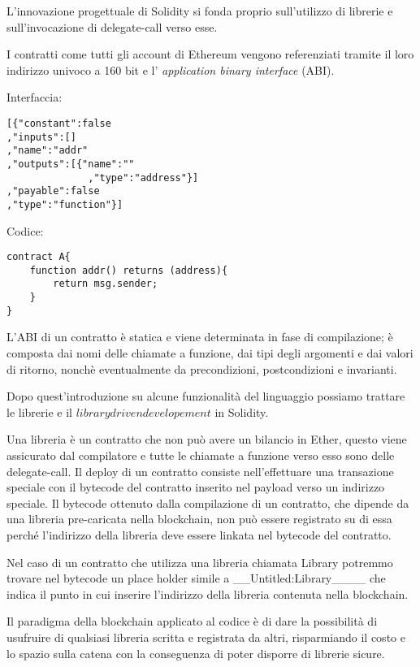 		L'innovazione progettuale di Solidity si fonda proprio sull'utilizzo di librerie e sull'invocazione di delegate-call verso esse.

		I contratti come tutti gli account di Ethereum vengono referenziati tramite il loro indirizzo univoco a 160 bit e l' \textit{application binary interface} (ABI).
	
		\begin{multicols}{2}
			 Interfaccia:
			\begin{lstlisting}
[{"constant":false
,"inputs":[]
,"name":"addr"
,"outputs":[{"name":""
			  ,"type":"address"}]
,"payable":false
,"type":"function"}]
			\end{lstlisting}
			\columnbreak
			Codice:
			\begin{lstlisting}
contract A{
	function addr() returns (address){
		return msg.sender;
	}
}
			\end{lstlisting}
		\end{multicols}
		
		L'ABI di un contratto è statica e viene determinata in fase di compilazione; è composta dai nomi delle chiamate a funzione, dai tipi degli argomenti e dai valori di ritorno, nonchè eventualmente da precondizioni, postcondizioni e invarianti.
		
		Dopo quest'introduzione su alcune funzionalità del linguaggio possiamo trattare le librerie e il $library driven developement$ in Solidity.
		
		Una libreria è un contratto che non può avere un bilancio in Ether, questo viene assicurato dal compilatore e tutte le chiamate a funzione verso esso sono delle delegate-call.
		Il deploy di un contratto consiste nell'effettuare una transazione speciale con il bytecode del contratto inserito nel payload verso un indirizzo speciale.
		Il bytecode ottenuto dalla compilazione di un contratto, che dipende da una libreria pre-caricata nella blockchain, non può essere registrato su di essa perché l'indirizzo della libreria deve essere linkata nel bytecode del contratto. 
		
		Nel caso di un contratto che utilizza una libreria chiamata Library potremmo trovare nel bytecode un place holder simile a \_\_Untitled:Library\_\_\_\_ che indica il punto in cui inserire l'indirizzo della libreria contenuta nella blockchain.
	 
		Il paradigma della blockchain applicato al codice è di dare la possibilità di usufruire di qualsiasi libreria scritta e registrata da altri, risparmiando il costo e lo spazio sulla catena con la conseguenza di poter disporre di librerie sicure.
		

